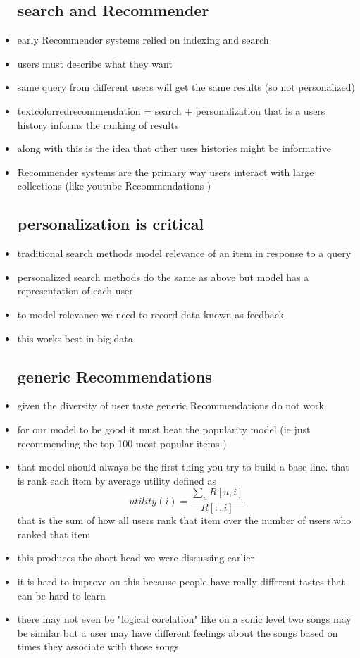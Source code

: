 \documentclass{article}
\begin{document}
\begin{itemize}
\subsection*{search and Recommender}
\item early Recommender systems relied on indexing and search 
\item users must describe what they want 
\item same query from different users will get the same results (so not personalized)
\item textcolor{red}{recommendation = search + personalization} that is a users history informs the ranking of results
\item along with this is the idea that other uses histories might be informative 
\item Recommender systems are the primary way users interact with large collections (like youtube Recommendations )
\subsection*{personalization is critical}
\item traditional search methods model relevance of an item in response to a query
\item personalized search methods do the same as above but model has a representation of each user 
\item to model relevance we need to record data known as feedback 
\item this works best in big data 
\subsection*{generic Recommendations}
\item given the diversity of user taste generic Recommendations do not work 
\item for our model to be good it must beat the popularity model (ie just recommending the top 100 most popular items )
\item that model should always be the first thing you try to build a base line. that is rank each item by average utility defined as $$utility(i)=\frac{\sum_{u}R[u,i]}{R[:,i]}$$ that is the sum of how all users rank that item over the number of users who ranked that item 
\item this produces the short head we were discussing earlier
\item it is hard to improve on this because people have really different tastes that can be hard to learn 
\item there may not even be "logical corelation" like on a sonic level two songs may be similar but a user may have different feelings about the songs based on times they associate with those songs 

\end{itemize}
\end{document}
